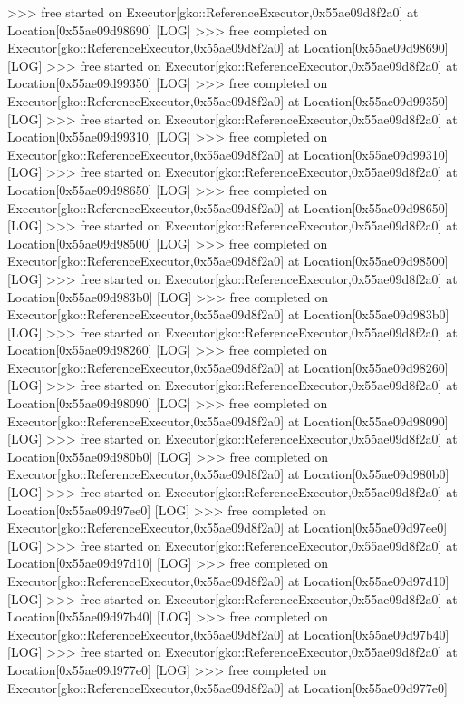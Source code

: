 \begin{DoxyCode}
[LOG] >>> free started on Executor[gko::ReferenceExecutor,0x55ae09d8f2a0] at Location[0x55ae09d98690]
[LOG] >>> free completed on Executor[gko::ReferenceExecutor,0x55ae09d8f2a0] at Location[0x55ae09d98690]
[LOG] >>> free started on Executor[gko::ReferenceExecutor,0x55ae09d8f2a0] at Location[0x55ae09d99350]
[LOG] >>> free completed on Executor[gko::ReferenceExecutor,0x55ae09d8f2a0] at Location[0x55ae09d99350]
[LOG] >>> free started on Executor[gko::ReferenceExecutor,0x55ae09d8f2a0] at Location[0x55ae09d99310]
[LOG] >>> free completed on Executor[gko::ReferenceExecutor,0x55ae09d8f2a0] at Location[0x55ae09d99310]
[LOG] >>> free started on Executor[gko::ReferenceExecutor,0x55ae09d8f2a0] at Location[0x55ae09d98650]
[LOG] >>> free completed on Executor[gko::ReferenceExecutor,0x55ae09d8f2a0] at Location[0x55ae09d98650]
[LOG] >>> free started on Executor[gko::ReferenceExecutor,0x55ae09d8f2a0] at Location[0x55ae09d98500]
[LOG] >>> free completed on Executor[gko::ReferenceExecutor,0x55ae09d8f2a0] at Location[0x55ae09d98500]
[LOG] >>> free started on Executor[gko::ReferenceExecutor,0x55ae09d8f2a0] at Location[0x55ae09d983b0]
[LOG] >>> free completed on Executor[gko::ReferenceExecutor,0x55ae09d8f2a0] at Location[0x55ae09d983b0]
[LOG] >>> free started on Executor[gko::ReferenceExecutor,0x55ae09d8f2a0] at Location[0x55ae09d98260]
[LOG] >>> free completed on Executor[gko::ReferenceExecutor,0x55ae09d8f2a0] at Location[0x55ae09d98260]
[LOG] >>> free started on Executor[gko::ReferenceExecutor,0x55ae09d8f2a0] at Location[0x55ae09d98090]
[LOG] >>> free completed on Executor[gko::ReferenceExecutor,0x55ae09d8f2a0] at Location[0x55ae09d98090]
[LOG] >>> free started on Executor[gko::ReferenceExecutor,0x55ae09d8f2a0] at Location[0x55ae09d980b0]
[LOG] >>> free completed on Executor[gko::ReferenceExecutor,0x55ae09d8f2a0] at Location[0x55ae09d980b0]
[LOG] >>> free started on Executor[gko::ReferenceExecutor,0x55ae09d8f2a0] at Location[0x55ae09d97ee0]
[LOG] >>> free completed on Executor[gko::ReferenceExecutor,0x55ae09d8f2a0] at Location[0x55ae09d97ee0]
[LOG] >>> free started on Executor[gko::ReferenceExecutor,0x55ae09d8f2a0] at Location[0x55ae09d97d10]
[LOG] >>> free completed on Executor[gko::ReferenceExecutor,0x55ae09d8f2a0] at Location[0x55ae09d97d10]
[LOG] >>> free started on Executor[gko::ReferenceExecutor,0x55ae09d8f2a0] at Location[0x55ae09d97b40]
[LOG] >>> free completed on Executor[gko::ReferenceExecutor,0x55ae09d8f2a0] at Location[0x55ae09d97b40]
[LOG] >>> free started on Executor[gko::ReferenceExecutor,0x55ae09d8f2a0] at Location[0x55ae09d977e0]
[LOG] >>> free completed on Executor[gko::ReferenceExecutor,0x55ae09d8f2a0] at Location[0x55ae09d977e0]

\end{DoxyCode}
